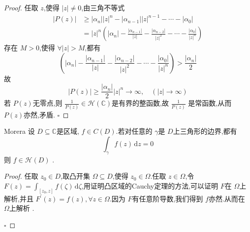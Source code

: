 \documentclass[../../复变函数.tex]{subfiles}
\begin{document}
\begin{proof}
    任取 \(  z  \),使得 \(  \left| z \right|\neq 0   \),由三角不等式\[
\begin{aligned}
    \left| P\left( z \right)  \right|&\ge \left| \alpha _{n} \right|\left| z \right|^{n}-\left| \alpha _{n-1} \right|\left| z \right|^{n-1}     -\cdots -\left| \alpha _0  \right| \\ 
     & =  \left| z \right|^{n} \left( \left| \alpha _{n} \right|- \frac{\left| \alpha _{n-1} \right|  }{\left| z \right|  }- \frac{\left| \alpha _{n-2} \right|  }{\left| z \right|^{2}  }    -\cdots - \frac{\left| \alpha _{0} \right|  }{\left| z \right|^{n}  } \right)  
\end{aligned}
    \]  存在 \(  M> 0  \),使得 \(  \forall \left| z \right|> M   \),都有  
    \[
        \left( \left| \alpha _{n} \right|- \frac{\left| \alpha _{n-1} \right|  }{\left| z \right|  }- \frac{\left| \alpha _{n-2} \right|  }{\left| z \right|^{2}  }    -\cdots - \frac{\left| \alpha _{0} \right|  }{\left| z \right|^{n}  } \right)  > \frac{\left| \alpha _{n} \right|  }{2 } 
    \]故 \[
    \left| P\left( z \right)  \right|\ge \frac{\left| \alpha _{n} \right|  }{2 } \left| z \right|^{n}\to \infty ,\quad \left( \left| z \right|\to \infty  \right)    
    \]若 \(  P\left( z \right)   \)无零点,则 \(  \frac{1 }{P\left( z \right)  } \in \mathcal{H}\left( \mathbb{C}  \right)    \)是有界的整函数,故 \(  \frac{1}{P\left( z \right) }  \)   是常函数,从而 \(  P\left( z \right)   \)亦然,矛盾. 
    \hfill $\square$
\end{proof}

\begin{theorem}{Morera}
    设 \(  D\subseteq \mathbb{C}   \)是区域, \(  f \in C\left( D \right)   \).若对任意的 \(   \gamma   \)是 \(  D  \)上三角形的边界,都有   \[
    \int_{ \gamma }f\left( z \right)\,\mathrm{d} z= 0 
    \]则 \(  f \in \mathcal{H}\left( D \right)   \)   .
\end{theorem}

\begin{proof}
    任取 \(  z_0 \in D  \),取凸开集 \(   \Omega \subseteq D  \),使得 \(  z_0 \in  \Omega   \).任取 \(  z \in  \Omega   \),令 \(  F\left( z \right)= \int_{\left[ z_0,z \right] }f\left( \zeta  \right)\,\mathrm{d} \zeta     \),用证明凸区域的Cauchy定理的方法,可以证明 \(  F  \)在 \(   \Omega   \)上解析,并且 \(  F^{\prime} \left( z \right)= f\left( z \right),\forall z \in  \Omega     \).因为 \(  F  \)有任意阶导数,我们得到 \(  f  \)亦然.从而在 \(   \Omega   \)上解析 .          

    \hfill $\square$
\end{proof}
\end{document}
